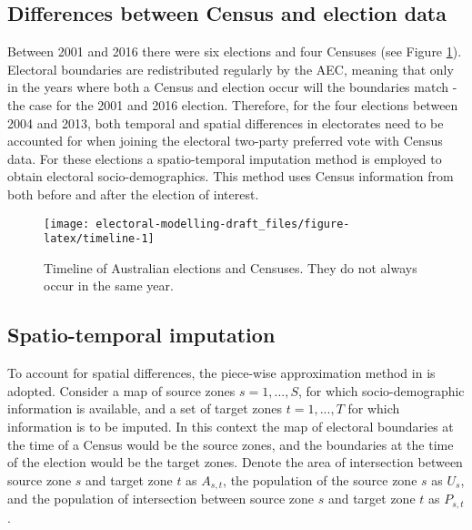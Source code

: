 \documentclass[openany]{book}
\begin{document}
\hypertarget{differences-between-census-and-election-data}{%
\subsection{Differences between Census and election data}\label{differences-between-census-and-election-data}}

Between 2001 and 2016 there were six elections and four Censuses (see Figure \ref{fig:timeline}). Electoral boundaries are redistributed regularly by the AEC, meaning that only in the years where both a Census and election occur will the boundaries match - the case for the 2001 and 2016 election. Therefore, for the four elections between 2004 and 2013, both temporal and spatial differences in electorates need to be accounted for when joining the electoral two-party preferred vote with Census data. For these elections a spatio-temporal imputation method is employed to obtain electoral socio-demographics. This method uses Census information from both before and after the election of interest.

\begin{figure}[h]

{\centering \texttt{[image: electoral-modelling-draft\_files/figure-latex/timeline-1]} 

}

\caption{Timeline of Australian elections and Censuses. They do not always occur in the same year.}\label{fig:timeline}
\end{figure}

\hypertarget{spatio-temporal-imputation}{%
\subsection{Spatio-temporal imputation}\label{spatio-temporal-imputation}}

To account for spatial differences, the piece-wise approximation method in \citet{Goodchild1993} is adopted. Consider a map of source zones \(s = 1,...,S\), for which socio-demographic information is available, and a set of target zones \(t = 1,...,T\) for which information is to be imputed. In this context the map of electoral boundaries at the time of a Census would be the source zones, and the boundaries at the time of the election would be the target zones. Denote the area of intersection between source zone \(s\) and target zone \(t\) as \(A_{s,t}\), the population of the source zone \(s\) as \(U_s\), and the population of intersection between source zone \(s\) and target zone \(t\) as \(P_{s,t}\).
\end{document}
